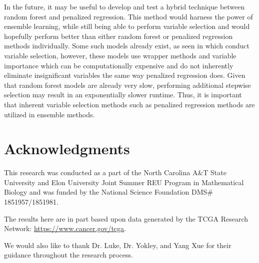 \documentclass{article}
\begin{document}
	In the future, it may be useful to develop and test a hybrid technique between random forest and penalized regression. This method would harness the power of ensemble learning, while still being able to perform variable selection and would hopefully perform better than either random forest or penalized regression methods individually. Some such models already exist, as seen in \cite{capitaine2021random, degenhardt2019evaluation, zhang2016variable} which conduct variable selection, however, these models use wrapper methods and variable importance which can be computationally expensive and do not inherently eliminate insignificant variables the same way penalized regression does. Given that random forest models are already very slow, performing additional stepwise selection may result in an exponentially slower runtime. Thus, it is important that inherent variable selection methods such as penalized regression methods are utilized in ensemble methods.
	
	\section{Acknowledgments}
	
	This research was conducted as a part of the North Carolina A\&T State University and Elon University Joint Summer REU Program in Mathematical Biology and was funded by the National Science Foundation DMS\# 1851957/1851981.
	
	The results here are in part based upon data generated by the TCGA Research Network: \href{https://www.cancer.gov/tcga}{https://www.cancer.gov/tcga}.
	
	We would also like to thank Dr. Luke, Dr. Yokley, and Yang Xue for their guidance throughout the research process.
	
\end{document}

